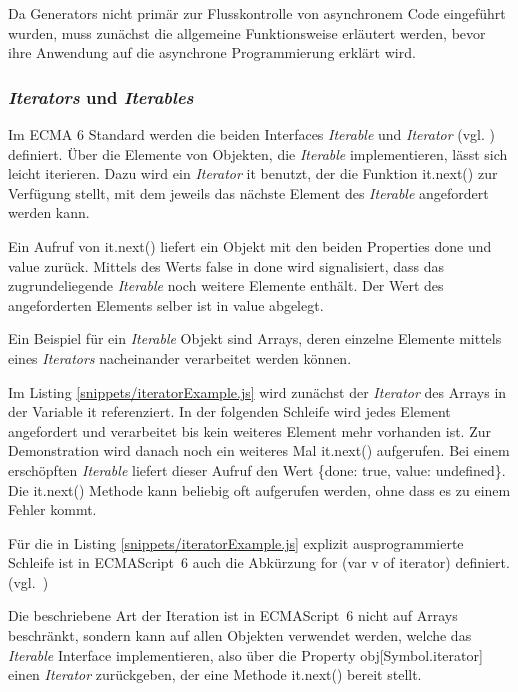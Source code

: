 \documentclass[
11pt, %
a4paper, %
oneside, %
pdfspacing, %
headinclude,
BCOR5mm, %
ngerman, %
bibtotocnumbered,
]{scrartcl}
\begin{document}
	\skippingparagraph
	Da Generators nicht primär zur Flusskontrolle von asynchronem Code eingeführt wurden, muss zunächst die allgemeine Funktionsweise erläutert werden, bevor ihre Anwendung auf die asynchrone Programmierung erklärt wird.
	
	\subsubsection{\emph{Iterators} und \emph{Iterables}}

	Im ECMA 6 Standard werden die beiden Interfaces \emph{Iterable} und \emph{Iterator} (vgl. \citep[\S~25.1.1]{EcmaTC39.}) definiert. 
	Über die Elemente von Objekten, die \emph{Iterable} implementieren, lässt sich leicht iterieren. Dazu wird ein \emph{Iterator} \textsf{it} benutzt, der die Funktion \textsf{it.next()} zur Verfügung stellt, mit dem jeweils das nächste Element des \emph{Iterable} angefordert werden kann.
	
	Ein Aufruf von \textsf{it.next()} liefert ein Objekt mit den beiden Properties \textsf{done} und \textsf{value} zurück. Mittels des Werts \textsf{false} in \textsf{done} wird signalisiert, dass das zugrundeliegende \emph{Iterable} noch weitere Elemente enthält. Der Wert des angeforderten Elements selber ist in \textsf{value} abgelegt.
	
	Ein Beispiel für ein \emph{Iterable} Objekt sind Arrays, deren einzelne Elemente mittels eines \emph{Iterators} nacheinander verarbeitet werden können. 
	
	
	Im Listing \ref{snippets/iteratorExample.js} wird zunächst der \emph{Iterator} des Arrays in der Variable \textsf{it} referenziert. In der folgenden Schleife wird jedes Element angefordert und verarbeitet bis kein weiteres Element mehr vorhanden ist. Zur Demonstration wird danach noch ein weiteres Mal \textsf{it.next()} aufgerufen. Bei einem erschöpften \emph{Iterable} liefert dieser Aufruf den Wert \textsf{\{done: true, value: undefined\}}. Die \textsf{it.next()} Methode kann beliebig oft aufgerufen werden, ohne dass es zu einem Fehler kommt.
	
	Für die in Listing \ref{snippets/iteratorExample.js} explizit ausprogrammierte Schleife ist in ECMAScript~6 auch die Abkürzung \textsf{for (var v  of iterator)} definiert. (vgl.~\citep[\S~13.7.5]{EcmaTC39.})
	
	Die beschriebene Art der Iteration ist in ECMAScript~6 nicht auf Arrays beschränkt, sondern kann auf allen Objekten verwendet werden, welche das \emph{Iterable} Interface implementieren, also über die Property \textsf{obj[Symbol.iterator]} einen \emph{Iterator} zurückgeben, der eine Methode \textsf{it.next()} bereit stellt.
	
\end{document}
